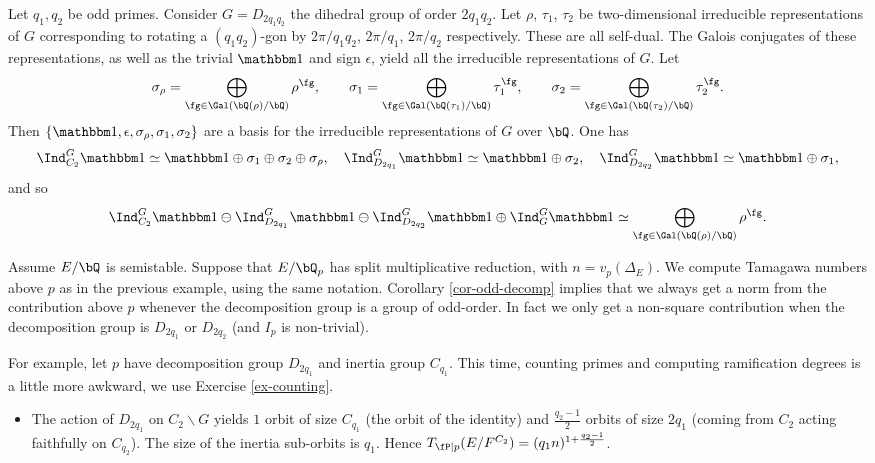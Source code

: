 \begin{example}[Dihedral]
    Let $q_1, q_2$ be odd primes. Consider $G = D_{2 q_1 q_2}$ the dihedral group of order $2 q_1 q_2$. 
    Let $\rho$, $\tau_1$, $\tau_2$ be two-dimensional irreducible representations of $G$ corresponding to rotating a $(q_1 q_2)$-gon by $2 \pi / q_1 q_2$, $2 \pi / q_1$, $2 \pi/ q_2$ respectively. These are all self-dual. The Galois conjugates of these representations, as well as the trivial $\trivial$ and sign $\epsilon$, yield all the irreducible representations of $G$. Let 
    \[  \sigma_{\rho} = \bigoplus_{ \fg \in \Gal(\bQ(\rho) / \bQ)} \rho^{\fg}, \qquad
        \sigma_1 = \bigoplus_{ \fg \in \Gal(\bQ(\tau_1) / \bQ)} \tau_1^{\fg}, \qquad
        \sigma_2 = \bigoplus_{ \fg \in \Gal(\bQ(\tau_2) / \bQ)} \tau_2^{\fg}. \]  
    Then $ \{ \trivial , \epsilon, \sigma_{\rho}, \sigma_1, \sigma_2 \}$ are a basis for the irreducible representations of $G$ over $\bQ$. 
    One has
\[
        \Ind_{C_2}^G \trivial \simeq \trivial \oplus \sigma_1 \oplus \sigma_2 \oplus \sigma_{\rho}, \quad
        \Ind_{D_{2 q_1}}^G \trivial \simeq \trivial \oplus \sigma_2, \quad
        \Ind_{D_{2 q_2}}^G \trivial \simeq \trivial \oplus \sigma_1,
\]
and so 
\begin{equation*}
\Ind_{C_2}^G \trivial \ominus \Ind_{D_{2 q_1}}^G \trivial \ominus \Ind_{D_{2 q_2}}^G \trivial \oplus \Ind_{G}^G \trivial \simeq \bigoplus_{ \fg \in \Gal(\bQ(\rho) / \bQ)} \rho^{\fg}.
\end{equation*}

    Assume $E / \bQ$ is semistable. Suppose that $E / \bQ_p$ has split multiplicative reduction, with $n = v_p(\Delta_E)$. We compute Tamagawa numbers above $p$ as in the previous example, using the same notation. 
    Corollary \ref{cor-odd-decomp} implies that we always get a norm from the contribution above $p$ whenever the decomposition group is a group of odd-order. In fact we only get a non-square contribution when the decomposition group is $D_{2 q_1}$ or $D_{2 q_2}$ (and $I_p$ is non-trivial). 
     
    For example, let $p$ have decomposition group $D_{2 q_1}$ and inertia group $C_{q_1}$.
    This time, counting primes and computing ramification degrees is a little more awkward, we use Exercise \ref{ex-counting}.
        \begin{itemize}[--]
            \setlength\itemsep{0em}
            \item The action of $D_{2 q_1}$ on $C_2 \backslash G$ yields $1$ orbit of size $C_{q_1}$ (the orbit of the identity) and $\frac{q_2 - 1}{2}$ orbits of size $2q_1$ (coming from $C_2$ acting faithfully on $C_{q_2}$). The size of the inertia sub-orbits is $q_1$. Hence $T_{\fP \mid p}(E / F^{C_2}) = (q_1 n)^{1 + \frac{q_2 - 1}{2}}$.
            

\end{itemize}
\end{example}

